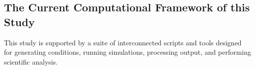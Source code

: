 \subsection{The Current Computational Framework of this Study}
This study is supported by a suite of interconnected scripts and tools designed for generating conditions, running simulations, processing output, and performing scientific analysis.


